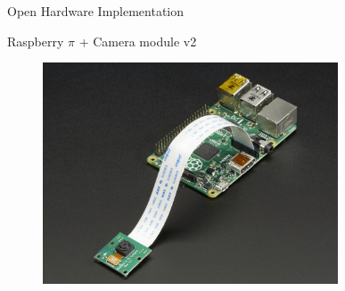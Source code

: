 \begin{frame}{Open Hardware Implementation}
\begin{center}
\Large{Raspberry $\pi$ + Camera module v2}
\end{center}
\begin{figure}[h!]
\centering
\includegraphics[width=0.78\textwidth]{./images/rpi-cam.jpg}
\end{figure}
\end{frame}

